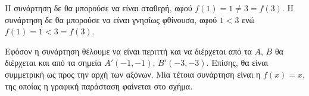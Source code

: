 \begin{alist}
\item Η συνάρτηση δε θα μπορούσε να είναι σταθερή, αφού $f(1) = 1 \neq 3 = f(3)$.
Η συνάρτηση δε θα μπορούσε να είναι γνησίως φθίνουσα, αφού $1 < 3$ ενώ $f(1) = 1 < 3 = f(3)$.
\item Εφόσον η συνάρτηση θέλουμε να είναι περιττή και να διέρχεται από τα $A$, $B$ θα διέρχεται και από τα σημεία $A'(-1, -1)$, $B'(-3, -3)$.
Επίσης, θα είναι συμμετρική ως προς την αρχή των αξόνων.
Μία τέτοια συνάρτηση είναι η $f(x) = x$, της οποίας η γραφική παράσταση φαίνεται στο σχήμα.
\end{alist}

